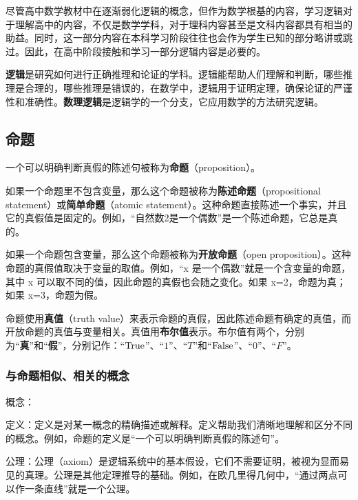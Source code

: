 
\begin{issues}
\issueDraft
\end{issues}

尽管高中数学教材中在逐渐弱化逻辑的概念，但作为数学根基的内容，学习逻辑对于理解高中的内容，不仅是数学学科，对于理科内容甚至是文科内容都具有相当的助益。同时，这一部分内容在本科学习阶段往往也会作为学生已知的部分略讲或跳过。因此，在高中阶段接触和学习一部分逻辑内容是必要的。

\textbf{逻辑}是研究如何进行正确推理和论证的学科。逻辑能帮助人们理解和判断，哪些推理是合理的，哪些推理是错误的，在数学中，逻辑用于证明定理，确保论证的严谨性和准确性。\textbf{数理逻辑}是逻辑学的一个分支，它应用数学的方法研究逻辑。


\subsection{命题}

一个可以明确判断真假的陈述句被称为\textbf{命题}（proposition）。

如果一个命题里不包含变量，那么这个命题被称为\textbf{陈述命题}（propositional statement）或\textbf{简单命题}（atomic statement）。这种命题直接陈述一个事实，并且它的真假值是固定的。例如，“自然数2是一个偶数”是一个陈述命题，它总是真的。

如果一个命题包含变量，那么这个命题被称为\textbf{开放命题}（open proposition）。这种命题的真假值取决于变量的取值。例如，“x 是一个偶数”就是一个含变量的命题，其中 x 可以取不同的值，因此命题的真假也会随之变化。如果 x=2，命题为真；如果 x=3，命题为假。

命题使用\textbf{真值}（truth value）来表示命题的真假，因此陈述命题有确定的真值，而开放命题的真值与变量相关。真值用\textbf{布尔值}表示。布尔值有两个，分别为“\textbf{真}”和“\textbf{假}”，分别记作：“${\rm True}$”、“$1$”、“$T$”和“${\rm False}$”、“$0$”、“$F$”。

\subsubsection{与命题相似、相关的概念}

概念：

定义：定义是对某一概念的精确描述或解释。定义帮助我们清晰地理解和区分不同的概念。例如，命题的定义是“一个可以明确判断真假的陈述句”。

公理：公理（axiom）是逻辑系统中的基本假设，它们不需要证明，被视为显而易见的真理。公理是其他定理推导的基础。例如，在欧几里得几何中，“通过两点可以作一条直线”就是一个公理。

